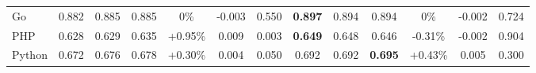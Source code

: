 \begin{table*}[h]
{\begin{tabular}{lcccccccccccc}
Go                                                                                  & 0.882                                                                           & 0.885                                                                              & 0.885                                                                         & 0\%                              & -0.003                                          & 0.550 & \textbf{0.897                                                                           } & 0.894                                                                              & 0.894                                                                          & 0\%                              & -0.002                                          & 0.724                                                                           \\
PHP                                                                                 & 0.628                                                                           & 0.629                                                                              & 0.635                                                                         & +0.95\%                          & 0.009                                     & 0.003 & \textbf{0.649                                                                           } & 0.648                                                                              & 0.646                                                                          & -0.31\%                          &  -0.002                                        & 0.904 \\
Python                                                                              & 0.672                                                                           & 0.676                                                                              & 0.678                                                                         & +0.30\%                          &  0.004                                        & 0.050 & 0.692                                                                            & 0.692                                                                              & \textbf{0.695                                                                         } & +0.43\%                          & 0.005                                       & 0.300 \\ \hline

\end{tabular}}
\end{table*}
